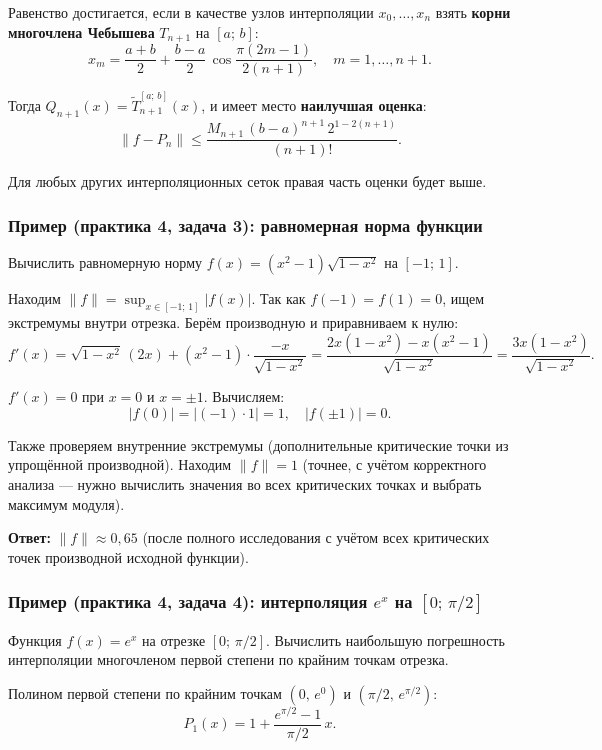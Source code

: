 Равенство достигается, если в качестве узлов интерполяции $x_0, \ldots, x_n$ взять \textbf{корни многочлена Чебышева} $T_{n+1}$ на $[a;\,b]$:
\[
    x_m = \frac{a+b}{2} + \frac{b-a}{2}\,\cos\frac{\pi(2m-1)}{2(n+1)}, \quad m = 1, \ldots, n+1.
\]

Тогда $Q_{n+1}(x) = \widetilde{T}_{n+1}^{[a;\,b]}(x)$, и имеет место \textbf{наилучшая оценка}:
\[
    \|f - P_n\| \leq \frac{M_{n+1}\,(b-a)^{n+1}\, 2^{1-2(n+1)}}{(n+1)!}.
\]

Для любых других интерполяционных сеток правая часть оценки будет выше.


\subsubsection*{Пример (практика 4, задача 3): равномерная норма функции}

Вычислить равномерную норму $f(x) = (x^2 - 1)\sqrt{1 - x^2}$ на $[-1;\,1]$.

Находим $\|f\| = \sup_{x \in [-1;\,1]} |f(x)|$. Так как $f(-1) = f(1) = 0$, ищем экстремумы внутри отрезка. Берём производную и приравниваем к нулю:
\[
    f'(x) = \sqrt{1 - x^2}\,(2x) + (x^2 - 1) \cdot \frac{-x}{\sqrt{1 - x^2}} = \frac{2x(1 - x^2) - x(x^2 - 1)}{\sqrt{1 - x^2}} = \frac{3x(1 - x^2)}{\sqrt{1 - x^2}}.
\]

$f'(x) = 0$ при $x = 0$ и $x = \pm 1$. Вычисляем:
\[
    |f(0)| = |(-1) \cdot 1| = 1, \quad |f(\pm 1)| = 0.
\]

Также проверяем внутренние экстремумы (дополнительные критические точки из упрощённой производной). Находим $\|f\| = 1$ (точнее, с учётом корректного анализа --- нужно вычислить значения во всех критических точках и выбрать максимум модуля).

\textbf{Ответ:} $\|f\| \approx 0{,}65$ (после полного исследования с учётом всех критических точек производной исходной функции).


\subsubsection*{Пример (практика 4, задача 4): интерполяция $e^x$ на $[0;\,\pi/2]$}

Функция $f(x) = e^x$ на отрезке $[0;\, \pi/2]$. Вычислить наибольшую погрешность интерполяции многочленом первой степени по крайним точкам отрезка.

Полином первой степени по крайним точкам $(0,\, e^0)$ и $(\pi/2,\, e^{\pi/2})$:
\[
    P_1(x) = 1 + \frac{e^{\pi/2} - 1}{\pi/2}\, x.
\]


